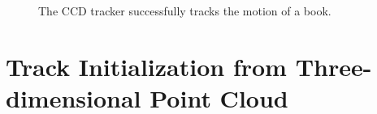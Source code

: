 \begin{figure}[htbp]
\begin{minipage}[t]{0.5\linewidth}
  \end{minipage} 
  \begin{minipage}[t]{0.5\linewidth} 
    \centering 
  \end{minipage} 
  \begin{minipage}[t]{0.5\linewidth} 
    \centering 
  \end{minipage} 
  \caption[The tracking result based on SIFT contour initialization]{The
    CCD tracker successfully tracks the motion of a book.
  }
  \label{fig:sifttracker}
\end{figure}


\section{Track Initialization from Three-dimensional Point Cloud}
\label{sec:tifpc}

